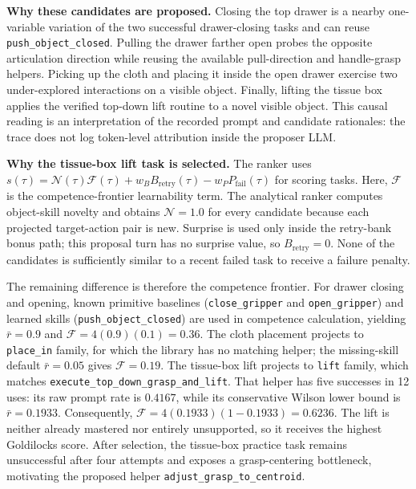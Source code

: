 \textbf{Why these candidates are proposed.}
Closing the top drawer is a nearby one-variable variation
of the two successful drawer-closing tasks and can reuse
\texttt{push\_object\_closed}. Pulling the drawer farther open probes the
opposite articulation direction while reusing the available pull-direction and
handle-grasp helpers. Picking up the cloth and placing it inside the open drawer
exercise two under-explored interactions on a visible object. Finally, lifting the
tissue box applies the verified top-down lift routine to a novel visible
object. This causal reading is an interpretation of the recorded prompt and
candidate rationales: the trace does not log token-level attribution inside the
proposer LLM.

\textbf{Why the tissue-box lift task is selected.}
The ranker uses
$s(\tau)=\mathcal{N}(\tau)\mathcal{F}(\tau)+w_BB_{\mathrm{retry}}(\tau)
-w_PP_{\mathrm{fail}}(\tau)$ for scoring tasks. Here, $\mathcal{F}$ is the competence-frontier learnability term. The analytical ranker computes
object-skill novelty and obtains $\mathcal{N}=1.0$ for every
candidate because each projected target-action pair is new. Surprise is used
only inside the retry-bank bonus path; this proposal turn has no surprise value, so $B_{\mathrm{retry}}=0$. None of the candidates
is sufficiently similar to a recent failed task to receive a failure penalty.

The remaining difference is therefore the competence frontier. For drawer closing and
opening, known primitive baselines
(\texttt{close\_gripper} and \texttt{open\_gripper}) and learned skills (\texttt{push\_object\_closed}) are used in competence calculation, yielding
$\bar{r}=0.9$ and $\mathcal{F}=4(0.9)(0.1)=0.36$. The cloth placement projects to \texttt{place\_in} family, for which the
library has no matching helper; the missing-skill default $\bar{r}=0.05$ gives
$\mathcal{F}=0.19$. The tissue-box lift projects to \texttt{lift} family, which
matches \texttt{execute\_top\_down\_grasp\_and\_lift}. That helper has five
successes in 12 uses: its raw prompt rate is $0.4167$, while its conservative
Wilson lower bound is $\bar{r}=0.1933$. Consequently,
$\mathcal{F}=4(0.1933)(1-0.1933)=0.6236$. The lift is neither already mastered
nor entirely unsupported, so it receives the highest Goldilocks score. After
selection, the tissue-box practice task remains unsuccessful after four
attempts and exposes a grasp-centering bottleneck, motivating the proposed
helper \texttt{adjust\_grasp\_to\_centroid}.

